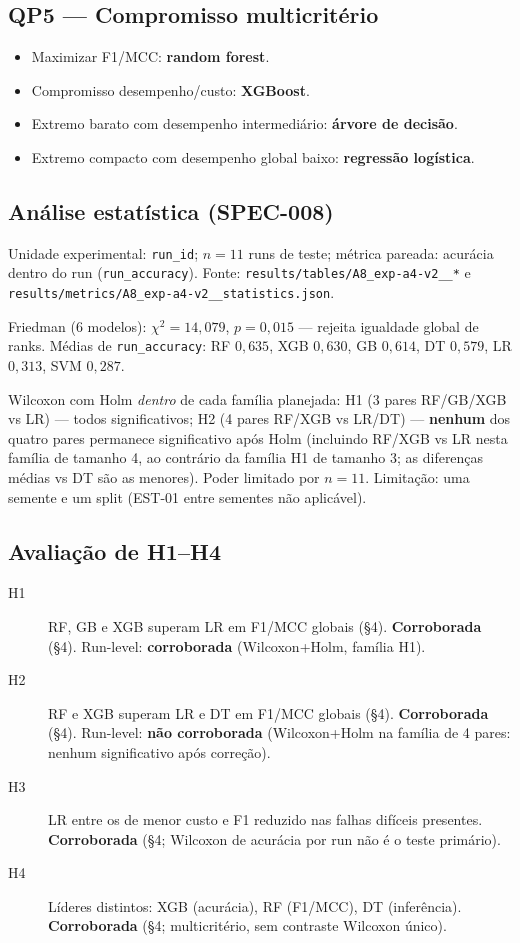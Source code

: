 \documentclass[11pt,a4paper]{article}
\begin{document}
\subsection{QP5 --- Compromisso multicritério}

\begin{itemize}
  \item Maximizar F1/MCC: \textbf{random forest}.
  \item Compromisso desempenho/custo: \textbf{XGBoost}.
  \item Extremo barato com desempenho intermediário: \textbf{árvore de decisão}.
  \item Extremo compacto com desempenho global baixo: \textbf{regressão logística}.
\end{itemize}

\subsection{Análise estatística (SPEC-008)}

Unidade experimental: \texttt{run\_id}; $n{=}11$ runs de teste; métrica pareada:
acurácia dentro do run (\texttt{run\_accuracy}). Fonte:
\texttt{results/tables/A8\_exp-a4-v2\_\_*} e
\texttt{results/metrics/A8\_exp-a4-v2\_\_statistics.json}.

Friedman (6 modelos): $\chi^2{=}14{,}079$, $p{=}0{,}015$ --- rejeita igualdade
global de ranks. Médias de \texttt{run\_accuracy}: RF $0{,}635$, XGB $0{,}630$,
GB $0{,}614$, DT $0{,}579$, LR $0{,}313$, SVM $0{,}287$.

Wilcoxon com Holm \emph{dentro} de cada família planejada: H1 (3 pares
RF/GB/XGB vs LR) --- todos significativos; H2 (4 pares RF/XGB vs LR/DT) ---
\textbf{nenhum} dos quatro pares permanece significativo após Holm (incluindo
RF/XGB vs LR nesta família de tamanho 4, ao contrário da família H1 de tamanho
3; as diferenças médias vs DT são as menores). Poder limitado por $n{=}11$.
Limitação: uma semente e um split (EST-01 entre sementes não aplicável).

\subsection{Avaliação de H1--H4}

\begin{description}
  \item[H1] RF, GB e XGB superam LR em F1/MCC globais (\S4).
  \textbf{Corroborada} (§4). Run-level: \textbf{corroborada}
  (Wilcoxon+Holm, família H1).
  \item[H2] RF e XGB superam LR e DT em F1/MCC globais (\S4).
  \textbf{Corroborada} (§4). Run-level: \textbf{não corroborada}
  (Wilcoxon+Holm na família de 4 pares: nenhum significativo após correção).
  \item[H3] LR entre os de menor custo e F1 reduzido nas falhas difíceis
  presentes. \textbf{Corroborada} (§4; Wilcoxon de acurácia por run não é o
  teste primário).
  \item[H4] Líderes distintos: XGB (acurácia), RF (F1/MCC), DT (inferência).
  \textbf{Corroborada} (§4; multicritério, sem contraste Wilcoxon único).
\end{description}
\end{document}
